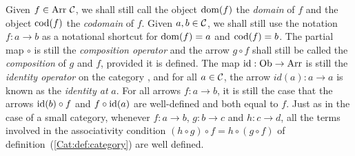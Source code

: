 Given $f\in\mbox{\rm Arr}\ \mbox{$\cal C$}$, we shall still call the object $\mbox{\rm dom}(f)$ the 
{\em domain} of $f$ and the object $\mbox{\rm cod}(f)$ the {\em codomain} of $f$.
Given $a,b\in\mbox{$\cal C$}$, we shall still use the notation $f:a\to b$ as a
notational shortcut for $\mbox{\rm dom}(f)=a$ and $\mbox{\rm cod}(f)=b$. The partial map
$\circ$ is still the {\em composition operator} and the arrow $g\circ f$
shall still be called the {\em composition} of $g$ and $f$, provided it
is defined. The map $\mbox{\rm id}:\mbox{\rm Ob}\to\mbox{\rm Arr}$ is still the {\em identity operator}
on the category \Cat, and for all $a\in\mbox{$\cal C$}$, the arrow $id(a):a\to a$ is 
known as the {\em identity at} $a$. For all arrows $f:a\to b$, it is still
the case that the arrows $\mbox{\rm id}(b)\circ f$ and $f\circ\mbox{\rm id}(a)$ are well-defined
and both equal to $f$. Just as in the case of a small category, whenever 
$f:a\to b$, $g:b\to c$ and $h:c\to d$, all the terms involved in the 
associativity condition $(h\circ g)\circ f=h\circ(g\circ f)$ of
definition~(\ref{Cat:def:category}) are well defined.
